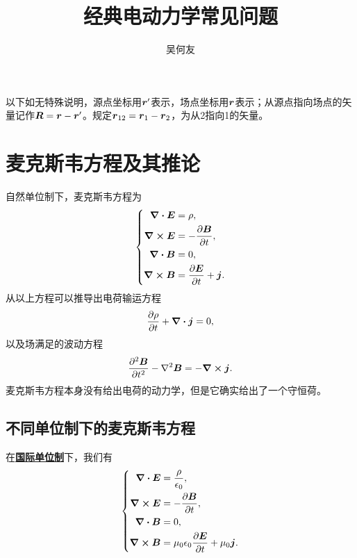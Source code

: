\documentclass[UTF8, a4paper]{ctexart}
\title{经典电动力学常见问题}
\author{吴何友}
\newcommand*{\concept}[1]{\underline{\textbf{#1}}}
\begin{document}
\maketitle

以下如无特殊说明，源点坐标用$\vb*{r}'$表示，场点坐标用$\vb*{r}$表示；从源点指向场点的矢量记作$\vb*{R} = \vb*{r} - \vb*{r}'$。规定$\vb*{r}_{12} = \vb*{r}_1 - \vb*{r}_2$，为从2指向1的矢量。

\section{麦克斯韦方程及其推论}

自然单位制下，麦克斯韦方程为
\begin{equation}
    \left\{
        \begin{aligned}
            \div{\vb*{E}} &= \rho, \\
            \curl{\vb*{E}} &= - \pdv{\vb*{B}}{t}, \\
            \div{\vb*{B}} &= 0, \\
            \curl{\vb*{B}} &= \pdv{\vb*{E}}{t} + \vb*{j}.
        \end{aligned}
    \right.
    \label{eq:maxwell-eq}
\end{equation}
从以上方程可以推导出电荷输运方程
\begin{equation}
    \pdv{\rho}{t} + \div{\vb*{j}} = 0,
    \label{eq:charge-transportation}
\end{equation}
以及场满足的波动方程
\begin{equation}
    \pdv[2]{\vb*{B}}{t} - \laplacian{\vb*{B}} = - \curl{\vb*{j}}.
\end{equation}
麦克斯韦方程本身没有给出电荷的动力学，但是它确实给出了一个守恒荷。

\subsection{不同单位制下的麦克斯韦方程}

在\concept{国际单位制}下，我们有
\begin{equation}
    \left\{
        \begin{aligned}
            \div{\vb*{E}} &= \frac{\rho}{\epsilon_0}, \\
            \curl{\vb*{E}} &= - \pdv{\vb*{B}}{t}, \\
            \div{\vb*{B}} &= 0, \\
            \curl{\vb*{B}} &= \mu_0 \epsilon_0 \pdv{\vb*{E}}{t} + \mu_0 \vb*{j}.
        \end{aligned}
    \right.
    \label{eq:maxwell-eq-si}
\end{equation}
\end{document}
